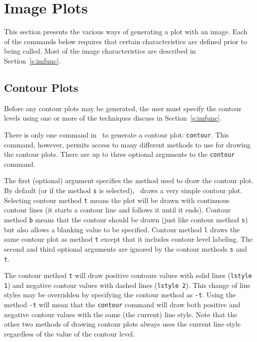 \section		{Image Plots}

This section presents the various ways of generating a plot with an image.
Each of the commands below requires that certain characteristics
are defined prior to being called.
Most of the image characteristics are described in Section~\ref{s:imfunc}.

\subsection*		{Contour Plots}

Before any contour plots may be generated, the user must specify the
contour levels using one or more of the techniques discuss in
Section~\ref{s:imfunc}.

There is only one command in \wip\ to generate a contour plot:
{\tt contour}.%
%
This command, however, permits access to many different methods to use
for drawing the contour plots.
There are up to three optional arguments to the {\tt contour} command.

The first (optional) argument specifies the method used to
draw the contour plot.
By default (or if the method {\tt s} is selected),
\wip\ draws a very simple contour plot.
Selecting contour method {\tt t} means the plot will be drawn with continuous
contour lines (\ie it starts a contour line and follows it until it ends).
Contour method {\tt b} means that the contour should be drawn (just like
contour method {\tt s}) but also allows a blanking value to be specified.
Contour method {\tt l} draws the same contour plot as method {\tt t} except
that it includes contour level labeling.
The second and third optional arguments are ignored
by the contour methods {\tt s} and {\tt t}.

The contour method {\tt t} will draw positive contours values with
solid lines ({\tt lstyle 1}) and
negative contour values with dashed lines ({\tt lstyle 2}).
This change of line styles may be overridden by specifying the contour
method as {\tt -t}.
Using the method {\tt -t} will mean that the {\tt contour} command will draw
both positive and negative contour values with the same (\ie the current)
line style.
Note that the
other two methods of drawing contour plots always uses the current line
style regardless of the value of the contour level.

